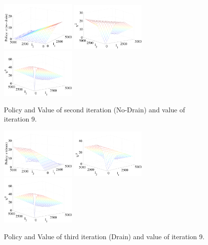 \begin{figure}[t]
\centering
\includegraphics[width=0.33\textwidth]{new_pics/policy-iteration2-3.pdf}
\includegraphics[width=0.33\textwidth]{new_pics/V2.pdf}
\includegraphics[width=0.33\textwidth]{new_pics/V9.pdf}
\caption{%
Policy and Value of second iteration (No-Drain) and value of iteration 9.
}
\label{fig:v2plots}
\end{figure}
\begin{figure}[t]
\centering
\includegraphics[width=0.33\textwidth]{new_pics/policy-iteration3-3.pdf}
\includegraphics[width=0.33\textwidth]{new_pics/V3.pdf}
\includegraphics[width=0.33\textwidth]{new_pics/V9.pdf}
\caption{%
Policy and Value of third iteration (Drain) and value of iteration 9.
}
\label{fig:v3plots}
\end{figure}

